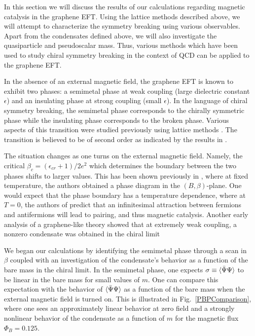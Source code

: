 \documentclass[aps,prd,twocolumn,showpacs,superscriptaddress,groupedaddress]{revtex4}  %
\begin{document}
In this section we will discuss the results of our calculations regarding magnetic catalysis in the graphene EFT. Using the lattice methods described above, we will attempt to characterize the symmetry breaking using various observables.
Apart from the condensates defined above, we will also investigate the quasiparticle and pseudoscalar mass. Thus, various methods which have been used to study chiral symmetry breaking in the
context of QCD can be applied to the graphene EFT.

In the absence of an external magnetic field, the graphene EFT is known to exhibit two phases: a semimetal phase at weak coupling (large dielectric constant $\epsilon$) and an insulating phase at strong coupling (small $\epsilon$). 
In the language of chiral symmetry breaking, the semimetal phase corresponds to the chirally symmetric phase while the insulating phase corresponds to the broken phase.
Various aspects of this transition were studied previously using lattice methods \cite{Drut1, Drut2, Hands1, Giedt}. The transition is believed to be of second order as indicated by the results in \cite{Drut2}. 

The situation changes as one turns on the external magnetic field. Namely, the critical $\beta_c = (\epsilon_{cr}+1)/2e^2$ which determines the boundary between the two phases shifts to larger values. This has been shown previously in \cite{Polikarpov}, where at fixed temperature, the authors
obtained a phase diagram in the $(B, \beta)$-plane. One would expect that the phase boundary has a temperature dependence, where at $T=0$, the authors of \cite{Miransky1,Miransky2,Miransky3,Miransky4,MiranskyGraphene1,MiranskyGraphene2,MiranskyGraphene3} predict that an infinitesimal attraction between fermions and antifermions will lead to pairing, and thus magnetic catalysis. Another early analysis of a graphene-like theory showed that at extremely weak coupling, a nonzero condensate was obtained in the chiral limit \cite{Cosmai}

We began our calculations by identifying the semimetal phase through a scan in $\beta$ coupled with an investigation of the condensate's behavior as a function of the bare mass in the chiral limit. In the semimetal phase, one expects $\sigma \equiv {\langle {\bar \Psi}\Psi \rangle}$ to be linear in the bare mass for small values of $m$. 
One can compare this expectation with the behavior of ${\langle {\bar \Psi} \Psi \rangle}$ as a function of the bare mass when the external magnetic field is turned on. This is illustrated in Fig.~\ref{PBPComparison}, where one sees an approximately linear behavior at zero field and a strongly nonlinear behavior of the condensate as a function of $m$ for the magnetic flux $\Phi_B = 0.125$.
\end{document}
